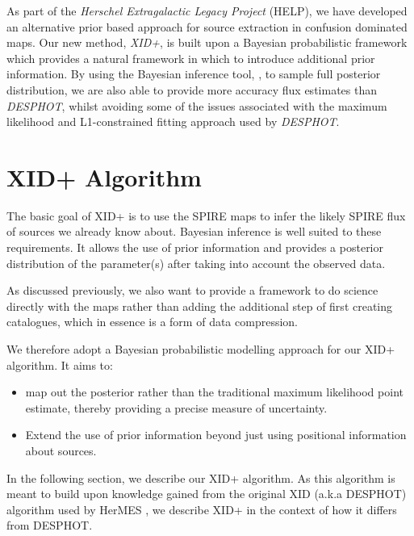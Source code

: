\documentclass[useAMS,usenatbib]{mn2e}
\begin{document}
 As part of the \emph{Herschel Extragalactic Legacy Project} (HELP), we have developed an alternative prior based approach for source extraction in confusion dominated maps. Our new method, \emph{XID+}, is built upon a Bayesian probabilistic framework which provides a natural framework in which to introduce additional prior information. By using the Bayesian inference tool, \citep[\emph{Stan}]{}, to sample full posterior distribution, we are also able to provide more accuracy flux estimates than \emph{DESPHOT}, whilst avoiding some of the issues associated with the maximum likelihood and L1-constrained fitting approach used by \emph{DESPHOT}.
 
\section{XID+ Algorithm}
The basic goal of XID+ is to use the SPIRE maps to infer the likely SPIRE flux of sources we already know about. Bayesian inference is well suited to these requirements. It allows the use of prior information and provides a posterior distribution of the parameter(s) after taking into account the observed data.  

As discussed previously, we also want to provide a framework to do science directly with the maps rather than adding the additional step of first creating catalogues, which in essence is a form of data compression.

We therefore adopt a Bayesian probabilistic modelling approach for our XID+ algorithm. It aims to:
\begin{itemize}
\item map out the posterior rather than the traditional maximum likelihood point estimate, thereby providing a precise measure of uncertainty. 
\item Extend the use of prior information beyond just using positional information about sources.
\end{itemize}

In the following section, we describe our XID+ algorithm. As this algorithm is meant to build upon knowledge gained from the original XID (a.k.a DESPHOT) algorithm used by HerMES \citep{Roseboom:2010, Roseboom:2011, Wang:2014}, we describe XID+ in the context of how it differs from DESPHOT. 

\end{document}
